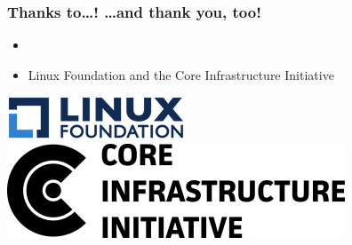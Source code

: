 \documentclass[14pt]{beamer}
\begin{document}
\begin{frame}
 \frametitle{Thanks to…! …and thank \textbf{you}, too!}

 \begin{itemize}
  \item
  \item Linux Foundation and the Core Infrastructure Initiative
\end{itemize}

 \begin{center}
  \includegraphics[height=0.1\paperheight]{images/linux_foundation_logo.png}
  \hspace{0.1\paperwidth}
  \includegraphics[height=0.1\paperheight]{images/cii_logo.png}
 \end{center}

 \vfill
 \begin{center}
 \end{center}
\end{frame}
\end{document}

